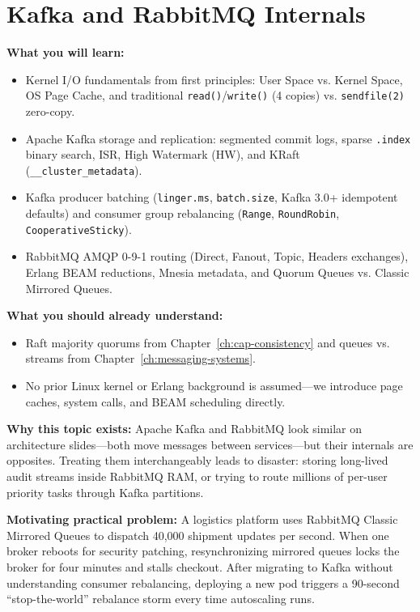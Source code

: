 \chapter{Kafka and RabbitMQ Internals}
\label{ch:kafka-rabbitmq}

\begin{chaptergoalsbox}
\textbf{What you will learn:}
\begin{itemize}[leftmargin=12pt]
  \item Kernel I/O fundamentals from first principles: User Space vs. Kernel Space, OS Page Cache, and traditional \texttt{read()}/\texttt{write()} (4 copies) vs. \texttt{sendfile(2)} zero-copy.
  \item Apache Kafka storage and replication: segmented commit logs, sparse \texttt{.index} binary search, ISR, High Watermark (HW), and KRaft (\texttt{\_\_cluster\_metadata}).
  \item Kafka producer batching (\texttt{linger.ms}, \texttt{batch.size}, Kafka 3.0+ idempotent defaults) and consumer group rebalancing (\texttt{Range}, \texttt{RoundRobin}, \texttt{CooperativeSticky}).
  \item RabbitMQ AMQP 0-9-1 routing (Direct, Fanout, Topic, Headers exchanges), Erlang BEAM reductions, Mnesia metadata, and Quorum Queues vs. Classic Mirrored Queues.
\end{itemize}

\textbf{What you should already understand:}
\begin{itemize}[leftmargin=12pt]
  \item Raft majority quorums from Chapter~\ref{ch:cap-consistency} and queues vs. streams from Chapter~\ref{ch:messaging-systems}.
  \item No prior Linux kernel or Erlang background is assumed---we introduce page caches, system calls, and BEAM scheduling directly.
\end{itemize}

\textbf{Why this topic exists:}
Apache Kafka and RabbitMQ look similar on architecture slides---both move messages between services---but their internals are opposites. Treating them interchangeably leads to disaster: storing long-lived audit streams inside RabbitMQ RAM, or trying to route millions of per-user priority tasks through Kafka partitions.

\textbf{Motivating practical problem:}
A logistics platform uses RabbitMQ Classic Mirrored Queues to dispatch 40,000 shipment updates per second. When one broker reboots for security patching, resynchronizing mirrored queues locks the broker for four minutes and stalls checkout. After migrating to Kafka without understanding consumer rebalancing, deploying a new pod triggers a 90-second ``stop-the-world'' rebalance storm every time autoscaling runs.
\end{chaptergoalsbox}

